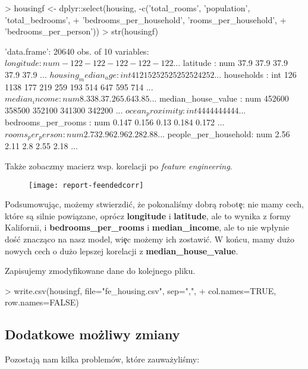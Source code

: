 \documentclass{article}
\begin{document}
\begin{Schunk}
\begin{Sinput}
> housingf <- dplyr::select(housing, -c('total_rooms', 'population', 'total_bedrooms',
+                                       'bedrooms_per_household', 'rooms_per_household',
+                                       'bedrooms_per_person'))
> str(housingf)
\end{Sinput}
\begin{Soutput}
'data.frame':	20640 obs. of  10 variables:
 $ longitude           : num  -122 -122 -122 -122 -122 ...
 $ latitude            : num  37.9 37.9 37.9 37.9 37.9 ...
 $ housing_median_age  : int  41 21 52 52 52 52 52 52 42 52 ...
 $ households          : int  126 1138 177 219 259 193 514 647 595 714 ...
 $ median_income       : num  8.33 8.3 7.26 5.64 3.85 ...
 $ median_house_value  : num  452600 358500 352100 341300 342200 ...
 $ ocean_proximity     : int  4 4 4 4 4 4 4 4 4 4 ...
 $ bedrooms_per_rooms  : num  0.147 0.156 0.13 0.184 0.172 ...
 $ rooms_per_person    : num  2.73 2.96 2.96 2.28 2.88 ...
 $ people_per_household: num  2.56 2.11 2.8 2.55 2.18 ...
\end{Soutput}
\end{Schunk}

\noindent
\quad Także zobaczmy macierz wsp. korelacji po \textit{feature engineering}.

\begin{figure}[h!]
\centering
\texttt{[image: report-feendedcorr]}
\end{figure}

\noindent
\quad Podsumowując, możemy stwierzdi\'c, że pokonaliśmy dobrą robot\c e: nie mamy cech, które są silnie powiązane, oprócz \textbf{longitude} i \textbf{latitude}, ale to wynika z formy Kalifornii, i \textbf{bedrooms\_per\_rooms} i \textbf{median\_income}, ale to nie wp\l ynie doś\'c znacząco na nasz model, wi\c ec możemy ich zostawi\'c. W końcu, mamy dużo nowych cech o dużo lepszej korelacji z \textbf{median\_house\_value}.

\noindent
\quad Zapisujemy zmodyfikowane dane do kolejnego pliku.

\begin{Schunk}
\begin{Sinput}
> write.csv(housingf, file="fe_housing.csv", sep=",", 
+           col.names=TRUE, row.names=FALSE)
\end{Sinput}
\end{Schunk}

\subsection{Dodatkowe możliwy zmiany}
\quad Pozostają nam kilka problemów, które zauważyliśmy:
\end{document}
